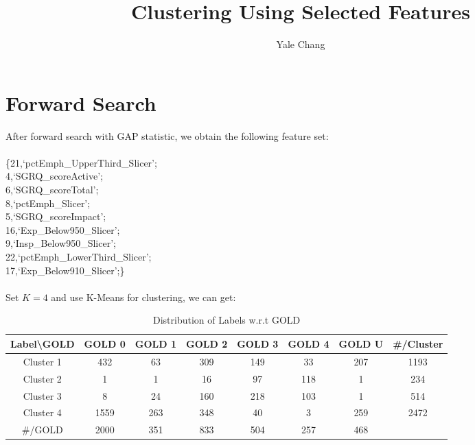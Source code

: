 \documentclass[11pt]{article}
\title{\textbf{Clustering Using Selected Features}}
\author{Yale Chang}
\date{}
\begin{document}
\maketitle

\section{Forward Search}
After forward search with GAP statistic, we obtain the following feature set:\\
\\
\{21,`pctEmph\_UpperThird\_Slicer';\\
4,`SGRQ\_scoreActive';\\
6,`SGRQ\_scoreTotal';\\
8,`pctEmph\_Slicer';\\
5,`SGRQ\_scoreImpact';\\
16,`Exp\_Below950\_Slicer';\\
9,`Insp\_Below950\_Slicer';\\
22,`pctEmph\_LowerThird\_Slicer';\\
17,`Exp\_Below910\_Slicer';\}\\
\\
Set $K=4$ and use K-Means for clustering, we can get:\\
\begin{table}[ht]
\caption{Distribution of Labels w.r.t GOLD}
\centering
\begin{tabular}{c c c c c c c|c}
\hline\hline
Label\textbackslash GOLD & GOLD 0 & GOLD 1 & GOLD 2 & GOLD 3 & GOLD 4 & GOLD U & \#/Cluster\\[1ex]
\hline
Cluster 1 & 432 & 63 & 309 & 149 & 33 & 207 & 1193\\
Cluster 2 & 1 & 1 & 16 & 97 & 118 & 1 & 234\\
Cluster 3 & 8 & 24 & 160 & 218 & 103 & 1 & 514\\
Cluster 4 & 1559 & 263 & 348 & 40 & 3 & 259 & 2472\\
\hline
\#/GOLD & 2000 & 351 & 833 & 504 & 257 & 468\\[1ex]
\hline
\end{tabular}
\label{table:dist_cluster_labels_gold_1}
\end{table}

\end{document}
